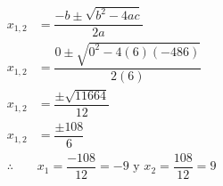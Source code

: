 \begin{solutionbox}{13cm}
\begin{multicols}{2}
\begin{align*}
            x_{1,2}    & = \dfrac{-b\pm\sqrt{b^2-4ac}}{2a}                           \\[2em]
            x_{1,2}    & = \dfrac{0\pm\sqrt{0^2-4(6)(-486)}}{2(6)}                   \\[2em]
            x_{1,2}    & = \dfrac{\pm\sqrt{11664}}{12}                               \\[2em]
            x_{1,2}    & = \dfrac{\pm108}{6}                                         \\[2em]
            \therefore & x_1 =\dfrac{-108}{12}=-9 \text{ y }  x_2 =\dfrac{108}{12}=9 \\[2em]
        \end{align*}
    \end{multicols}
\end{solutionbox}

